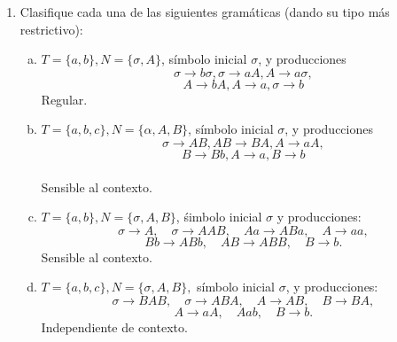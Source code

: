 \documentclass{article}
\begin{document}
\begin{enumerate}[1.]
\item
Clasifique cada una de las siguientes gramáticas (dando su tipo más restrictivo):
  \begin{enumerate}[a)]
    \item
      $T = \{ a,b\}, N = \{ \sigma, A\}$, símbolo inicial $\sigma$, y producciones
      \[ \sigma \rightarrow b\sigma, \sigma \rightarrow aA, A \rightarrow a\sigma,\]
      \[ A \rightarrow bA, A \rightarrow a, \sigma \rightarrow b\]
      Regular.
    \item 
      $T = \{ a,b,c \}, N = \{ \alpha,A,B\}$, símbolo inicial $\sigma$, y producciones
      \[ \sigma \rightarrow AB, AB \rightarrow BA, A \rightarrow aA,\]
      \[ B \rightarrow Bb, A \rightarrow a, B \rightarrow b\] \\
       Sensible al contexto.
    \item
      $T = \{ a,b\}, N = \{ \sigma, A,B\}$, śimbolo inicial $\sigma$ y producciones:
      \[ \sigma \rightarrow A, \quad \sigma \rightarrow AAB,\quad Aa \rightarrow ABa, \quad A \rightarrow aa,\]
      \[ Bb \rightarrow ABb, \quad AB \rightarrow ABB, \quad B \rightarrow b.\]
      Sensible al contexto.
    \item
      $T = \{ a,b,c \}, N = \{\sigma,A,B \},$ símbolo inicial $\sigma$, y producciones:
      \[ \sigma \rightarrow BAB, \quad \sigma \rightarrow ABA, \quad A \rightarrow AB, \quad B \rightarrow BA,\]
      \[A \rightarrow aA, \quad A ab, \quad B \rightarrow b.\]
      Independiente de contexto.
  \end{enumerate}
\end{enumerate}
\end{document}
